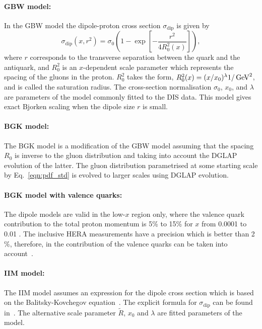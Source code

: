 \paragraph{GBW model:} \rm
In the GBW model the dipole-proton cross section $\sigma_{\text{dip}}$ is given by
\begin{equation}
\label{eGBW}
   \sigma_{\text{dip}}(x,r^{2}) = \sigma_{0} \left(1 - \exp \left[-\frac{r^{2}}{4R_{0}^{2}(x)} \right]\right),
\end{equation}
where $r$ corresponds to the transverse separation between the quark and the antiquark, and $R_{0}^{2}$
 is an $x$-dependent scale parameter which represents the spacing of the gluons in the proton. 
$R_{0}^{2}$ takes the form, $R_0^2(x) = (x/x_0)^\lambda  1/ {\rm \,\text{Ge\hspace{-.08em}V}}^{2}$, and is called the saturation radius.
The cross-section normalisation $\sigma_0$, $x_0$, and $\lambda$ are parameters 
of the model commonly fitted to the DIS data.
This model gives exact Bjorken scaling when the dipole size $r$ is small.
 
\paragraph{BGK model:} \rm
The BGK model is a modification of the GBW model assuming that the
spacing $R_0$ is inverse to the gluon distribution and taking
into account the DGLAP evolution of the latter.
The gluon distribution parametrised at some starting scale by Eq.~\ref{eqn:pdf_std}
is evolved to larger scales using DGLAP evolution.

\paragraph{BGK model with valence quarks:} \rm
The dipole models are valid in the low-$x$ region only, where the valence quark contribution to the total proton momentum 
is 5\% to 15\% for $x$ from 0.0001 to 0.01 \cite{Collaboration:2010ry}.
The inclusive HERA measurements have a precision which is better than 2$\%$, 
therefore, in \fitter the contribution of the valence quarks can be taken into account~\cite{Luszczak:2013rxa}.

\paragraph{IIM model:} \rm
The IIM model assumes an expression for the dipole cross section which is based on the 
Balitsky-Kovchegov equation~\cite{Balitsky:1995ub}. The explicit formula for $\sigma_{\text{dip}}$ 
can be found in~\cite{Iancu:2003ge}. 
The alternative scale parameter $\tilde{R}$, $x_{0}$ and $\lambda$ are fitted parameters of the model.

